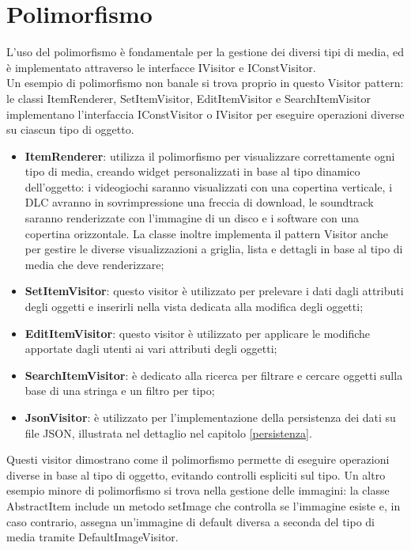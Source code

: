 \documentclass[10pt]{article}
\begin{document}
\section{Polimorfismo}
L'uso del polimorfismo è fondamentale per la gestione dei diversi tipi di media, ed è implementato attraverso le interfacce IVisitor e IConstVisitor.
\\Un esempio di polimorfismo non banale si trova proprio in questo Visitor pattern: le classi ItemRenderer, SetItemVisitor, EditItemVisitor e SearchItemVisitor implementano l'interfaccia IConstVisitor o IVisitor per eseguire operazioni diverse su ciascun tipo di oggetto.
\begin{itemize}
    \item \textbf{ItemRenderer}: utilizza il polimorfismo per visualizzare correttamente ogni tipo di media, creando widget personalizzati in base al tipo dinamico dell'oggetto: i videogiochi saranno visualizzati con una copertina verticale, i DLC avranno in sovrimpressione una freccia di download, le soundtrack saranno renderizzate con l'immagine di un disco e i software con una copertina orizzontale. La classe inoltre implementa il pattern Visitor anche per gestire le diverse visualizzazioni a griglia, lista e dettagli in base al tipo di media che deve renderizzare;
    \item \textbf{SetItemVisitor}: questo visitor è utilizzato per prelevare i dati dagli attributi degli oggetti e inserirli nella vista dedicata alla modifica degli oggetti;
    \item \textbf{EditItemVisitor}: questo visitor è utilizzato per applicare le modifiche apportate dagli utenti ai vari attributi degli oggetti;
    \item \textbf{SearchItemVisitor}: è dedicato alla ricerca per filtrare e cercare oggetti sulla base di una stringa e un filtro per tipo;
    \item \textbf{JsonVisitor}: è utilizzato per l'implementazione della persistenza dei dati su file JSON, illustrata nel dettaglio nel capitolo \ref{persistenza}.
\end{itemize}
Questi visitor dimostrano come il polimorfismo permette di eseguire operazioni diverse in base al tipo di oggetto, evitando controlli espliciti sul tipo. Un altro esempio minore di polimorfismo si trova nella gestione delle immagini: la classe AbstractItem include un metodo setImage che controlla se l'immagine esiste e, in caso contrario, assegna un'immagine di default diversa a seconda del tipo di media tramite DefaultImageVisitor.
\end{document}

